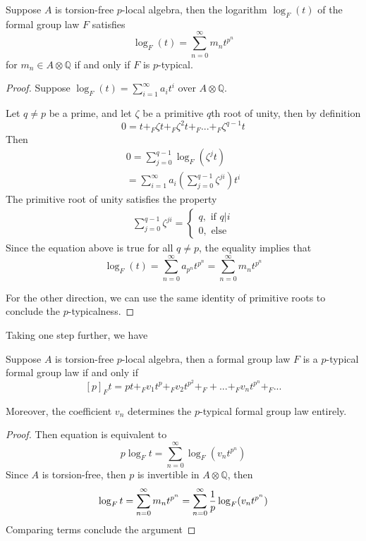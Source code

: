 \begin{lemma}
    Suppose $A$ is torsion-free $p$-local algebra, then the logarithm $\log_F(t)$ of the formal group law $F$ satisfies
    \[
    \log_F(t)= \sum_{n=0}^{\infty}m_{n}t^{p^n}
    \]for $m_{n}\in A\otimes\mathbb{Q}$ if and only if $F$ is $p$-typical.
\end{lemma}
\begin{proof}
    Suppose $\log_F (t)=\sum_{i=1}^{\infty}a_i t^i$ over $A\otimes\mathbb{Q}$.

    Let $q\neq p$ be a prime, and let $\zeta$ be a primitive $q$th root of unity, then by definition
    \[
    0=t+_F \zeta t+_F \zeta^2t+_F ...+_F \zeta^{q-1}t
    \]
    Then 
    \begin{align*}
        0=\sum_{j=0}^{q-1}\log_F(\zeta^{j}t)
        \\=\sum_{i=1}^{\infty}a_i (\sum_{j=0}^{q-1}\zeta^{ji})t^i
    \end{align*}
    The primitive root of unity satisfies the property
    \begin{align*}
        \sum_{j=0}^{q-1}\zeta^{ji}=\begin{cases}
            q, \text{ if $q|i$}
            \\ 0, \text{ else}
        \end{cases}
    \end{align*}
    Since the equation above is true for all $q\neq p$, the equality implies that 
    \[
    \log_F(t)= \sum_{n=0}^{\infty}a_{p^n}t^{p^n}=\sum_{n=0}^{\infty}m_{n}t^{p^n}
    \]

    For the other direction, we can use the same identity of primitive roots to conclude the $p$-typicalness.
\end{proof}

Taking one step further, we have
\begin{lemma}
    Suppose $A$ is torsion-free $p$-local algebra, then a formal group law $F$ is a $p$-typical formal group law if and only if 
    \[
    [p]_F t=pt+_F v_1t^{p}+_F v_2t^{p^2}+_F+...+_F v_nt^{p^n}+_F...
    \]

    Moreover, the coefficient $v_n$ determines the $p$-typical formal group law entirely.
\end{lemma}
\begin{proof}
    Then equation is equivalent to 
    \[
    p\log_F t=\sum_{n=0}^{\infty}\log_F(v_nt^{p^n})
    \]
    Since $A$ is torsion-free, then $p$ is invertible in $A\otimes \mathbb{Q}$, then 
    \[
    \log_F t=\sum_{n=0}^{\infty}m_{n}t^{p^n}
    \\=\sum_{n=0}^{\infty}\frac{1}{p}\log_F(v_nt^{p^n})
    \]
    Comparing terms conclude the argument
\end{proof}

